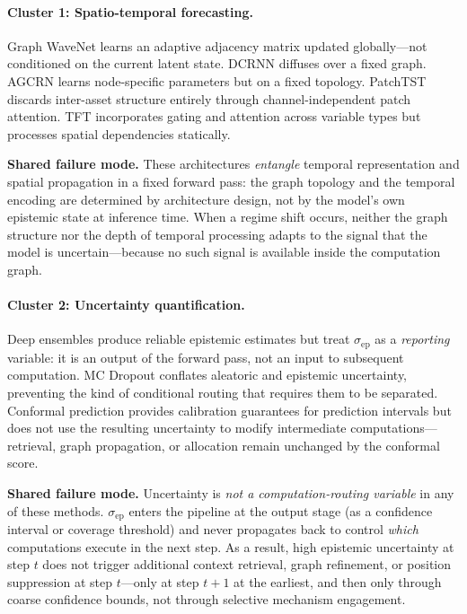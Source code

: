 \documentclass[11pt,a4paper]{article}
\newcommand{\sep}{\sigma_{\mathrm{ep}}}
\begin{document}
\paragraph{Cluster 1: Spatio-temporal forecasting.}
Graph WaveNet \citep{wu2019gwn} learns an adaptive adjacency matrix updated
globally—not conditioned on the current latent state.
DCRNN \citep{li2018dcrnn} diffuses over a fixed graph.
AGCRN \citep{bai2020agcrn} learns node-specific parameters but on a fixed
topology.  PatchTST \citep{nie2022patchtst} discards inter-asset structure
entirely through channel-independent patch attention.
TFT \citep{lim2021tft} incorporates gating and attention across variable types
but processes spatial dependencies statically.

\textbf{Shared failure mode.}
These architectures \emph{entangle} temporal representation and spatial
propagation in a fixed forward pass: the graph topology and the temporal
encoding are determined by architecture design, not by the model's own
epistemic state at inference time.  When a regime shift occurs, neither the
graph structure nor the depth of temporal processing adapts to the signal
that the model is uncertain—because no such signal is available inside the
computation graph.

\paragraph{Cluster 2: Uncertainty quantification.}
Deep ensembles \citep{lakshminarayanan2017simple} produce reliable epistemic
estimates but treat $\sep$ as a \emph{reporting} variable: it is an output
of the forward pass, not an input to subsequent computation.
MC Dropout \citep{gal2016uncertainty} conflates aleatoric and epistemic
uncertainty, preventing the kind of conditional routing that requires them
to be separated.
Conformal prediction \citep{vovk2005algorithmic,gibbs2021adaptive} provides
calibration guarantees for prediction intervals but does not use the
resulting uncertainty to modify intermediate computations—retrieval,
graph propagation, or allocation remain unchanged by the conformal score.

\textbf{Shared failure mode.}
Uncertainty is \emph{not a computation-routing variable} in any of these
methods.  $\sep$ enters the pipeline at the output stage (as a confidence
interval or coverage threshold) and never propagates back to control
\emph{which} computations execute in the next step.  As a result, high
epistemic uncertainty at step $t$ does not trigger additional context
retrieval, graph refinement, or position suppression at step $t$—only at
step $t+1$ at the earliest, and then only through coarse confidence bounds,
not through selective mechanism engagement.
\end{document}
